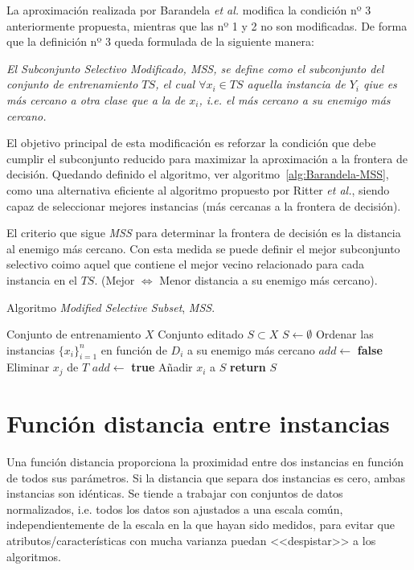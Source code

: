 La aproximación realizada por Barandela \textit{et al.} modifica la condición nº 3 anteriormente propuesta, mientras que las nº 1 y 2 no son modificadas. De forma que la definición nº 3 queda formulada de la siguiente manera:

\emph{El Subconjunto Selectivo Modificado, \textit{MSS}, se define como el subconjunto del conjunto de entrenamiento $TS$, el cual $\forall x_i \in TS$ aquella instancia de $Y_i$ qiue es más cercano a otra clase que a la de $x_i$, i.e. el más cercano a su enemigo más cercano.}


El objetivo principal de esta modificación es reforzar la condición que debe cumplir el subconjunto reducido para maximizar la aproximación a la frontera de decisión. Quedando definido el algoritmo, ver algoritmo~\ref{alg:Barandela-MSS}, como una alternativa eficiente al algoritmo propuesto por Ritter \textit{et al.}, siendo capaz de seleccionar mejores instancias (más cercanas a la frontera de decisión). 

El criterio que sigue \textit{MSS} para determinar la frontera de decisión es la distancia al enemigo más cercano. Con esta medida se puede definir el mejor subconjunto selectivo coimo aquel que contiene el mejor vecino relacionado para cada instancia en el $TS$. (Mejor $\iff$ Menor distancia a su enemigo más cercano).

\begin{algorithm}[H]
\caption{Algoritmo \textit{Modified Selective Subset}, \textit{MSS}.}\label{alg:Barandela-MSS}
\begin{algorithmic}[1]
\Require Conjunto de entrenamiento $X$
\Ensure Conjunto editado $S \subset X$
\Statex
{}	
	\State $S \leftarrow \emptyset$
	\State Ordenar las instancias $\lbrace x_i \rbrace^{n}_{i=1}$ en función de $D_i$ a su enemigo más cercano
		\State $add \leftarrow$ \textbf{false}
				 \State Eliminar $x_j$ de $T$
				 \State $add \leftarrow$ \textbf{true}
			\EndIf
		\EndFor
			\State Añadir $x_i$ a $S$
		\EndIf 
			\State \textbf{return} $S$
		\EndIf
	\EndFor
\EndProcedure
\end{algorithmic}
\end{algorithm}

\vfill
\section{Función distancia entre instancias}
Una función distancia proporciona la proximidad entre dos instancias en función de todos sus parámetros. Si la distancia que separa dos instancias es cero, ambas instancias son idénticas. Se tiende a trabajar con conjuntos de datos normalizados, i.e. todos los datos son ajustados a una escala común, independientemente de la escala en la que hayan sido medidos, para evitar que atributos/características con mucha varianza puedan <<despistar>> a los algoritmos.

